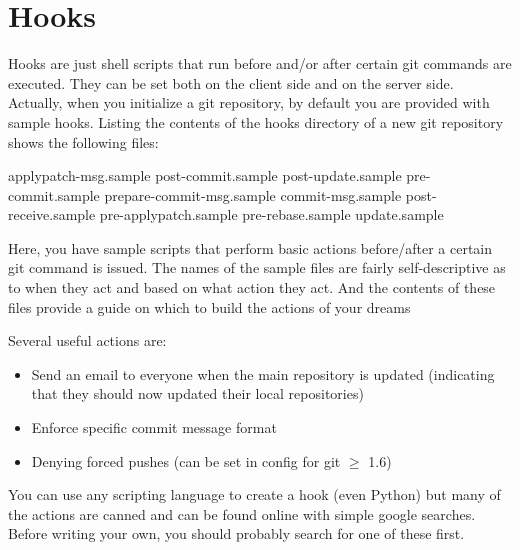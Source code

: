 \documentclass[10pt,letterpaper]{article}
\begin{document}
\section{Hooks}
\label{hooks}

Hooks are just shell scripts that run before and/or after certain git commands are executed. They can be set both on the client side and on the server side. Actually, when you initialize a git repository, by default you are provided with sample hooks. Listing the contents of the hooks directory of a new git repository shows the following files:
\begin{code}
applypatch-msg.sample     post-commit.sample        post-update.sample        pre-commit.sample         prepare-commit-msg.sample
commit-msg.sample         post-receive.sample       pre-applypatch.sample     pre-rebase.sample         update.sample
\end{code}
\noindent Here, you have sample scripts that perform basic actions before/after a certain git command is issued. The names of the sample files are fairly self-descriptive as to when they act and based on what action they act. And the contents of these files provide a guide on which to build the actions of your dreams \smiley

Several useful actions are:
\begin{itemize}
\item Send an email to everyone when the main repository is updated (indicating that they should now updated their local repositories)
\item Enforce specific commit message format
\item Denying forced pushes (can be set in config for git $\ge$ 1.6)
\end{itemize}

You can use any scripting language to create a hook (even Python) but many of the actions are canned and can be found online with simple google searches. Before writing your own, you should probably search for one of these first.
\end{document}
